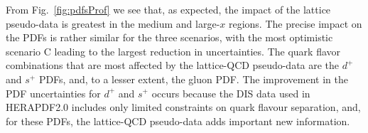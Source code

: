 From Fig.~\ref{fig:pdfsProf} we see that, as expected, the
impact of the lattice pseudo-data is greatest in the medium and large-$x$ regions.
%
The precise impact on the PDFs is rather
similar for the three scenarios, with the most optimistic
scenario C leading to the largest reduction in uncertainties.
%
The quark flavor combinations that are most affected by the
lattice-QCD pseudo-data are the $d^{+}$ and $s^{+}$ PDFs,
and, to a lesser extent, the gluon PDF.
%
The improvement in the PDF uncertainties for $d^{+}$ and $s^{+}$
occurs because the DIS data
used in HERAPDF2.0 includes only limited constraints
on quark flavour separation, and, for these PDFs, the lattice-QCD 
pseudo-data adds important new information.
